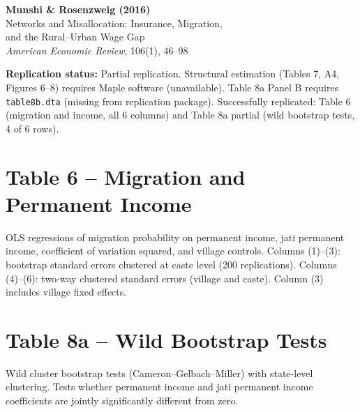 \documentclass[12pt]{article}
\begin{document}
\begin{center}
{\Large\bfseries Munshi \& Rosenzweig (2016)}\\
{\large Networks and Misallocation: Insurance, Migration,}\\
{\large and the Rural--Urban Wage Gap}\\
\vspace{0.5em}
{\normalsize \textit{American Economic Review}, 106(1), 46--98}
\end{center}

\vspace{1em}
\noindent\textbf{Replication status:} Partial replication.
Structural estimation (Tables 7, A4, Figures 6--8) requires Maple software (unavailable).
Table 8a Panel B requires \texttt{table8b.dta} (missing from replication package).
Successfully replicated: Table 6 (migration and income, all 6 columns) and
Table 8a partial (wild bootstrap tests, 4 of 6 rows).

\tableofcontents

\clearpage
\section{Table 6 -- Migration and Permanent Income}

OLS regressions of migration probability on permanent income, jati permanent income,
coefficient of variation squared, and village controls.
Columns (1)--(3): bootstrap standard errors clustered at caste level (200 replications).
Columns (4)--(6): two-way clustered standard errors (village and caste).
Column (3) includes village fixed effects.



\clearpage
\section{Table 8a -- Wild Bootstrap Tests}

Wild cluster bootstrap tests (Cameron--Gelbach--Miller) with state-level clustering.
Tests whether permanent income and jati permanent income coefficients are jointly
significantly different from zero.


\end{document}
